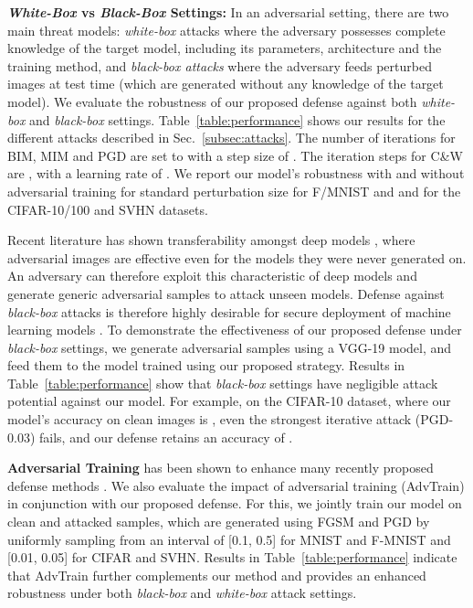\documentclass[10pt,twocolumn,letterpaper]{article}
\begin{document}
\noindent \textbf{\textit{White-Box} vs \textit{Black-Box} Settings:}
In an adversarial setting, there are two main threat models: \textit{white-box} attacks where the adversary possesses complete knowledge of the target model, including its parameters, architecture and the training method, and \textit{black-box attacks} where the adversary feeds perturbed images at test time (which are generated without any knowledge of the target model). We evaluate the robustness of our proposed defense against both \textit{white-box} and \textit{black-box} settings. Table~\ref{table:performance} shows our results for the different attacks described in Sec.~\ref{subsec:attacks}. The number of iterations for BIM, MIM and PGD are set to  with a step size of . The iteration steps for C\&W are , with a learning rate of . We report our model's robustness with and without adversarial training for standard perturbation size \ie  for F/MNIST and and  for the CIFAR-10/100 and SVHN datasets.

Recent literature has shown transferability amongst deep models \cite{tramer2017space,kurakin2016adversarial_2,43405}, where adversarial images are effective even for the models they were never generated on. An adversary can therefore exploit this characteristic of deep models and generate generic adversarial samples to attack unseen models. Defense against \textit{black-box} attacks is therefore highly desirable for secure deployment of machine learning models \cite{papernot2016limitations}. To demonstrate the effectiveness of our proposed defense under \textit{black-box} settings, we generate adversarial samples using a VGG-19 model, and feed them to the model trained using our proposed strategy. Results in Table~\ref{table:performance} show that \textit{black-box} settings have negligible attack potential against our model. For example, on the CIFAR-10 dataset, where our model's accuracy on clean images is , even the strongest iterative attack (PGD-0.03) fails, and our defense retains an accuracy of .


\noindent \textbf{Adversarial Training} has been shown to enhance many recently proposed defense methods \cite{kurakin2018adversarial}. We also evaluate the impact of adversarial training (AdvTrain) in conjunction with our proposed defense. For this, we jointly train our model on clean and attacked samples, which are generated using FGSM \cite{43405} and PGD \cite{madry2017towards} by uniformly sampling  from an interval of [0.1, 0.5] for MNIST and F-MNIST and [0.01, 0.05] for CIFAR and SVHN. Results in Table~\ref{table:performance} indicate that AdvTrain further complements our method and provides an enhanced robustness under both \textit{black-box} and \textit{white-box} attack settings.
\end{document}
